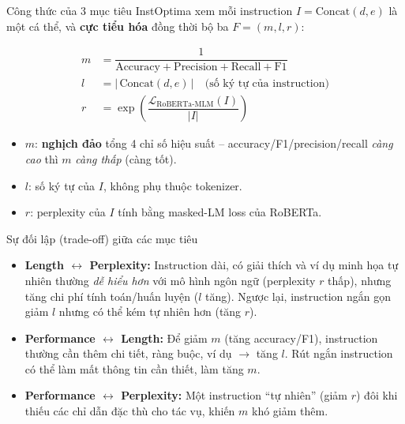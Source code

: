\documentclass[12pt,xcolor=table]{beamer}
\begin{document}
\begin{frame}{Công thức của 3 mục tiêu}
    InstOptima xem mỗi instruction $I = \text{Concat}(d,e)$ là một cá thể, và \textbf{cực tiểu hóa} đồng thời bộ ba $F = (m, l, r)$:

    \begin{align*}
        m &= \dfrac{1}{\text{Accuracy} + \text{Precision} + \text{Recall} + \text{F1}} \\[4pt]
        l &= \big|\,\text{Concat}(d, e)\,\big| \quad \text{(số ký tự của instruction)} \\[4pt]
        r &= \exp\!\left(\dfrac{\mathcal{L}_{\text{RoBERTa-MLM}}(I)}{|I|}\right)
    \end{align*}

    \begin{itemize}
        \item $m$: \textbf{nghịch đảo} tổng 4 chỉ số hiệu suất -- accuracy/F1/precision/recall \textit{càng cao} thì $m$ \textit{càng thấp} (càng tốt).
        \item $l$: số ký tự của $I$, không phụ thuộc tokenizer.
        \item $r$: perplexity của $I$ tính bằng masked-LM loss của RoBERTa.
    \end{itemize}
\end{frame}

\begin{frame}{Sự đối lập (trade-off) giữa các mục tiêu}
    \begin{itemize}
        \item \textbf{Length $\leftrightarrow$ Perplexity:} Instruction dài, có giải thích và ví dụ minh họa tự nhiên thường \textit{dễ hiểu hơn} với mô hình ngôn ngữ (perplexity $r$ thấp), nhưng tăng chi phí tính toán/huấn luyện ($l$ tăng). Ngược lại, instruction ngắn gọn giảm $l$ nhưng có thể kém tự nhiên hơn (tăng $r$).
        \vspace{0.2cm}
        \item \textbf{Performance $\leftrightarrow$ Length:} Để giảm $m$ (tăng accuracy/F1), instruction thường cần thêm chi tiết, ràng buộc, ví dụ $\to$ tăng $l$. Rút ngắn instruction có thể làm mất thông tin cần thiết, làm tăng $m$.
        \vspace{0.2cm}
        \item \textbf{Performance $\leftrightarrow$ Perplexity:} Một instruction ``tự nhiên'' (giảm $r$) đôi khi thiếu các chỉ dẫn đặc thù cho tác vụ, khiến $m$ khó giảm thêm.
    \end{itemize}
\end{frame}
\end{document}
